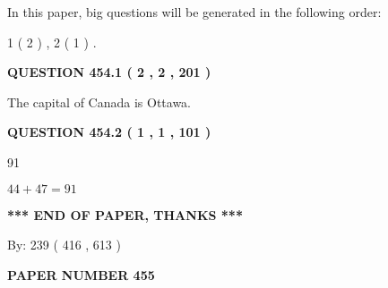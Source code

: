 \documentclass[12pt]{article}
\begin{document}
In this paper, big questions will be generated in the following order: 
   
   
   1 ( 2 )
 ,
   2 ( 1 )
 .
  
\vspace{0.2in}
  
{\textbf{\Large{QUESTION
454.1 
 ( 2 , 2 , 201 )
}}}
  
  
 
 
\noindent{}
 
 
The capital of Canada is Ottawa.
 
 
 
 
  
\vspace{0.2in}
  
{\textbf{\Large{QUESTION
454.2 
 ( 1 , 1 , 101 )
}}}
  
  
 
 
\noindent{}

91
 
 
 
 
\noindent{}

$ %
44 +  %
47=   %
91$
 
 
   
   
 \vspace{0.2in}
 
   
   
   
   
\vspace{1.0in} 
{\textbf{\large{ *** END OF PAPER, THANKS *** }}} 
   
   
\hspace{1.0in} By: 
 239 ( 416 ,  613 )
   
   
   
   
\newpage 
\setcounter{page}{ 
   455001 } 
   
   
   
   
 {\textbf{ \Large{ PAPER NUMBER  455  }}}
   
   
\vspace{0.2in}
   
   
   
   
   
\end{document}
